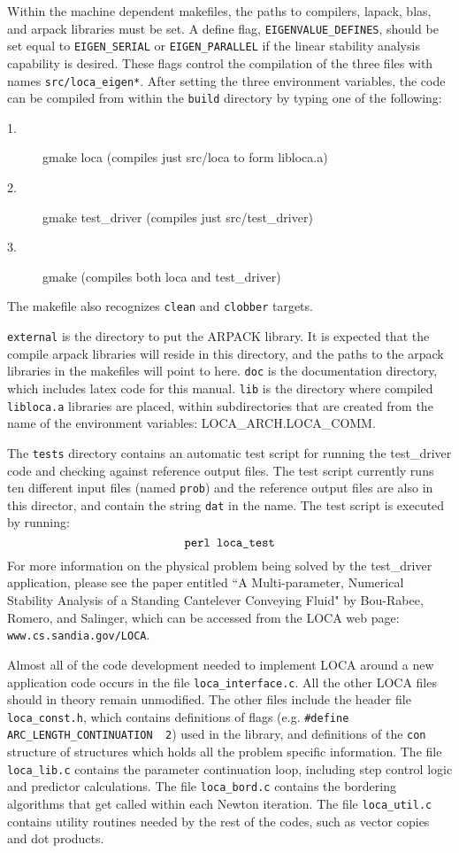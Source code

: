 Within the machine
dependent makefiles, the paths to compilers, lapack, blas, and arpack libraries must be set. A define flag, \texttt{EIGENVALUE\_DEFINES}, should be set equal to \texttt{EIGEN\_SERIAL} or \texttt{EIGEN\_PARALLEL} if the linear stability
analysis capability is desired. These flags control the compilation of the
three files with names \texttt{src/loca\_eigen*}. After setting the three environment variables, the code can be compiled from within the \texttt{build} directory
by typing one of the following:
\begin{description}
\item[1.] gmake loca (compiles just src/loca to form libloca.a)
\item[2.] gmake test\_driver (compiles just src/test\_driver)
\item[3.] gmake (compiles both loca and test\_driver)
\end{description}
The makefile also recognizes \texttt{clean} and \texttt{clobber} targets.

\texttt{external} is the directory to put the ARPACK library. It is expected that
the compile arpack libraries will reside in this directory, and the paths to the
arpack libraries in the makefiles will point to here. \texttt{doc} is the documentation directory, which includes latex code for this manual. \texttt{lib} is the directory where compiled \texttt{libloca.a} libraries are placed, within subdirectories that
are created from the name of the environment variables: LOCA\_ARCH.LOCA\_COMM. 

The \texttt{tests} directory contains an automatic test script for running the test\_driver code and checking against reference output files. The test script 
currently runs ten different input files (named \texttt{prob\*}) and the reference
output files are also in this director, and contain the string \texttt{dat} in the name. The test script is executed by running:
\begin{equation*}
\mbox{\texttt{perl loca\_test}}
\end{equation*}
For more information on the physical problem being solved by the test\_driver
application, please see the paper entitled ``A Multi-parameter, Numerical Stability Analysis of a Standing Cantelever Conveying Fluid" by Bou-Rabee, Romero, and Salinger, which can be accessed from the LOCA web page: \texttt{www.cs.sandia.gov/LOCA}.

Almost all of the code development needed to implement LOCA around a new application code occurs in the file \texttt{loca\_interface.c}. All the other LOCA files should in theory remain unmodified. The other files include the header file \texttt{loca\_const.h}, which contains definitions of flags (e.g. \texttt{\#define ARC\_LENGTH\_CONTINUATION { }2}) used in the library, and definitions of the \texttt{con} structure of structures which holds all the problem specific information. The file \texttt{loca\_lib.c} contains the parameter continuation loop, including step control logic and predictor calculations. The file \texttt{loca\_bord.c} contains the bordering algorithms that get called within each Newton iteration. The file \texttt{loca\_util.c} contains utility routines needed by the rest of the codes, such as vector copies and dot products.


